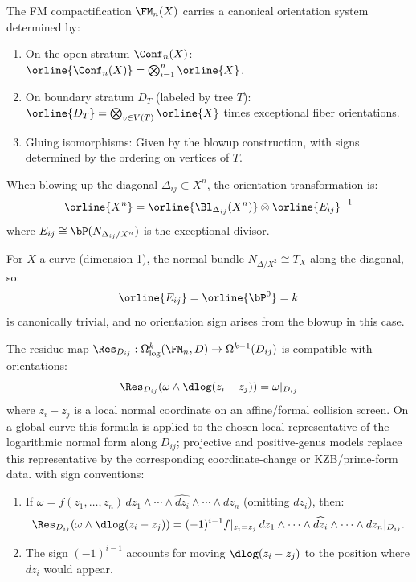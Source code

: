 \begin{proposition}
\label{prop:orient-fm}
The FM compactification $\FM_n(X)$ carries a canonical orientation system
determined by:
\begin{enumerate}[label=(\roman*)]
\item On the open stratum $\Conf_n(X)$: $\orline{\Conf_n(X)} = \bigotimes_{i=1}^n \orline{X}$.
\item On boundary stratum $D_T$ (labeled by tree $T$):
$\orline{D_T} = \bigotimes_{v \in V(T)} \orline{X}$ times exceptional fiber orientations.
\item Gluing isomorphisms: Given by the blowup construction, with signs determined
by the ordering on vertices of $T$.
\end{enumerate}
\end{proposition}

\begin{construction}
\label{constr:sign-blowup}
When blowing up the diagonal $\Delta_{ij} \subset X^n$, the orientation
transformation is:
\[
\orline{X^n} = \orline{\Bl_{\Delta_{ij}}(X^n)} \otimes \orline{E_{ij}}^{-1}
\]
where $E_{ij} \cong \bP(N_{\Delta_{ij}/X^n})$ is the exceptional divisor.

For $X$ a curve (dimension 1), the normal bundle $N_{\Delta/X^2} \cong T_X$
along the diagonal, so:
\[
\orline{E_{ij}} = \orline{\bP^0} = k
\]
is canonically trivial, and no orientation sign arises from the blowup in this case.
\end{construction}

\begin{lemma}
\label{lem:residue-orient}
The residue map $\Res_{D_{ij}}: \Omega^k_{\log}(\FM_n, D) \to \Omega^{k-1}(D_{ij})$
is compatible with orientations:
\[
\Res_{D_{ij}}(\omega \wedge \dlog(z_i - z_j)) = \omega|_{D_{ij}}
\]
where $z_i-z_j$ is a local normal coordinate on an affine/formal
collision screen.  On a global curve this formula is applied to the
chosen local representative of the logarithmic normal form along
$D_{ij}$; projective and positive-genus models replace this
representative by the corresponding coordinate-change or KZB/prime-form
data.
with sign conventions:
\begin{enumerate}[label=(\roman*)]
\item If $\omega = f(z_1, \ldots, z_n) \, dz_1 \wedge \cdots \wedge \widehat{dz_i} \wedge \cdots \wedge dz_n$
(omitting $dz_i$), then:
\[
\Res_{D_{ij}}(\omega \wedge \dlog(z_i - z_j)) = (-1)^{i-1} f|_{z_i = z_j} \,
dz_1 \wedge \cdots \wedge \widehat{dz_i} \wedge \cdots \wedge dz_n|_{D_{ij}}.
\]
\item The sign $(-1)^{i-1}$ accounts for moving $\dlog(z_i - z_j)$ to the position
where $dz_i$ would appear.
\end{enumerate}
\end{lemma}


